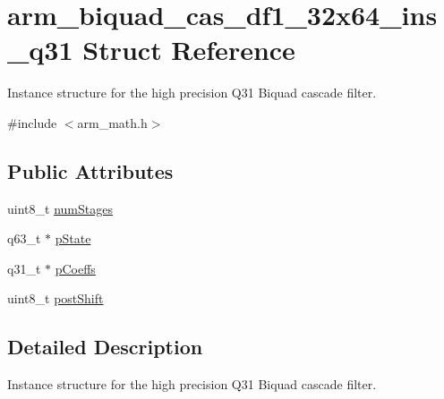 \hypertarget{structarm__biquad__cas__df1__32x64__ins__q31}{\section{arm\-\_\-biquad\-\_\-cas\-\_\-df1\-\_\-32x64\-\_\-ins\-\_\-q31 Struct Reference}
\label{structarm__biquad__cas__df1__32x64__ins__q31}
}


Instance structure for the high precision Q31 Biquad cascade filter.  




{\ttfamily \#include $<$arm\-\_\-math.\-h$>$}

\subsection*{Public Attributes}
\begin{DoxyCompactItemize}
\item 
uint8\-\_\-t \hyperlink{structarm__biquad__cas__df1__32x64__ins__q31_ad7cb9a9f5df8f4fcfc7a0b633672e574}{num\-Stages}
\item 
q63\-\_\-t $\ast$ \hyperlink{structarm__biquad__cas__df1__32x64__ins__q31_a4c899cdfaf2bb955323e93637bd662e0}{p\-State}
\item 
q31\-\_\-t $\ast$ \hyperlink{structarm__biquad__cas__df1__32x64__ins__q31_a490462d6ebe0fecfb6acbf51bed22ecf}{p\-Coeffs}
\item 
uint8\-\_\-t \hyperlink{structarm__biquad__cas__df1__32x64__ins__q31_a8e9d58e8dba5aa3b2fc4f36d2ed07996}{post\-Shift}
\end{DoxyCompactItemize}


\subsection{Detailed Description}
Instance structure for the high precision Q31 Biquad cascade filter. 

